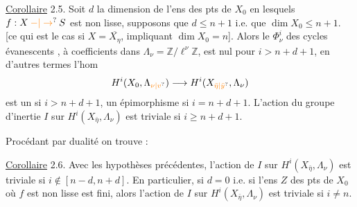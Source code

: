 \uline{Corollaire} 2.5.  Soit $d$ la dimension de l'ens des pts de $X_0$ en lesquels $f:X\mathbin{\unsure{-|\to}}S$ est non lisse,   supposons que $d\leq n+1$ i.e. que $\dim X_0\leq n+1$. [ce qui est le cas si $X=\overline{X_\eta}$, impliquant $\dim X_0=n$]. Alors le  $\Phi^i_\nu$ des cycles évanescents , à coefficients dans $\Lambda_\nu=\mathbb Z/\ell^\nu\mathbb Z$, est nul pour  $i>n+d+1$, en d'autres termes l'hom
\[
H^i(X_0,\Lambda_{\unsure{\nu|v}})\longrightarrow H^i(X_{\unsure{\bar\eta|\bar y}},\Lambda_\nu)
\]
est un  si $i>n+d+1$, un épimorphisme si $i=n+d+1$. L'action du groupe d'inertie  $I$ sur $H^i(X_{\bar\eta},\Lambda_\nu)$ est triviale si $i\geq n+d+1$.

Procédant par dualité on trouve :

\uline{Corollaire} 2.6. Avec les hypothèses précédentes, l'action de $I$ sur $H^i(X_{\bar\eta},\Lambda_\nu)$ est triviale si $i\notin[n-d,n+d]$.
En particulier, si $d=0$ i.e. si l'ens $Z$ des pts de $X_0$ où $f$ est non lisse est fini, alors l'action de $I$ sur $H^i(X_{\bar\eta},\Lambda_\nu)$ est triviale si $i\ne n$.

